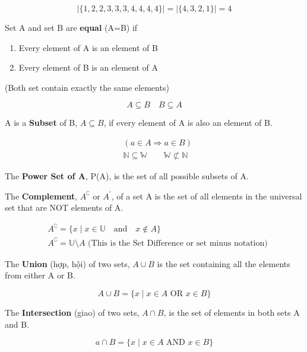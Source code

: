 \[ |\{1,2,2,3,3,3,4,4,4,4\}|=|\{4,3,2,1\}|=4 \]

\vspace{5 mm}

Set A and set B are \textbf{equal} (A=B) if

\begin{enumerate}
  \item Every element of A is an element of B
  \item Every element of B is an element of A
\end{enumerate}

(Both set contain exactly the same elements)

\[A \subseteq B\quad B \subseteq A\]

\vspace{7 mm}

A is a \textbf{Subset} of B, $A \subseteq B$, if every element of A is also an element of B.

\[
  \begin{aligned}
    &(a\in A \Longrightarrow a\in B)\\
    &\mathbb{N} \subseteq \mathbb{W} \qquad \mathbb{W} \not\subset \mathbb{N}
  \end{aligned}
\]

The \textbf{Power Set of A}, P(A), is the set of all possible subsets of A.

\vspace{10 mm}

The \textbf{Complement}, \(A^\complement \text{ or } A^\prime\), of a set A is the set of all elements in the universal set that are NOT elements of A.

\[
  \begin{aligned}
    &A^\complement = \{x \mid x \in \mathbb{U} \quad \text{and} \quad x \not\in A \}\\
    &A^\complement = \mathbb{U} \setminus A \text{ (This is the Set Difference or set minus notation)}
  \end{aligned}
\]

\vspace{8 mm}

The \textbf{Union} (hợp, hội) of two sets, $A \cup B$ is the set containing all the elements from either A or B.

\[A \cup B = \{ x \mid x \in A \text{ OR } x \in B \}\]

The \textbf{Intersection} (giao) of two sets, $A \cap B$, is the set of elements in both sets A and B.

\[a \cap B = \{ x \mid x\in A \text{ AND } x\in B \}\]

